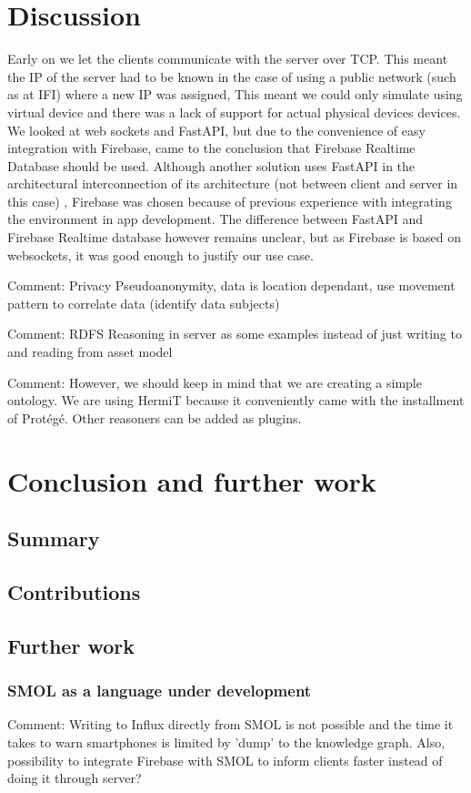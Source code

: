 \documentclass{article}
\begin{document}
\section{Discussion}\label{sec:Discussion}
Early on we let the clients communicate with the server over TCP. This meant the IP of the server had to be known in the case of using a public network (such as at IFI) where a new IP was assigned, This meant we could only simulate using virtual device and there was a lack of support for actual physical devices devices. We looked at web sockets and FastAPI, but due to the convenience of easy integration with Firebase, came to the conclusion that Firebase Realtime Database should be used. Although another solution uses FastAPI in the architectural interconnection of its architecture (not between client and server in this case) \cite{waszak_let_2022}, Firebase was chosen because of previous experience with integrating the environment in app development. The difference between FastAPI and Firebase Realtime database however remains unclear, but as Firebase is based on websockets, it was good enough to justify our use case.

Comment: Privacy
    Pseudoanonymity, data is location dependant, use movement pattern to correlate data (identify data subjects)


Comment: RDFS Reasoning in server as some examples instead of just writing to and reading from asset model

Comment: However, we should keep in mind that we are creating a simple ontology. We are using HermiT because it conveniently came with the installment of Protégé. Other reasoners can be added as plugins.




\newpage
\section{Conclusion and further work}\label{sec:Conclusion}
\subsection{Summary}
\subsection{Contributions}
\subsection{Further work}
\subsubsection{SMOL as a language under development}
Comment: Writing to Influx directly from SMOL is not possible and the time it takes to warn smartphones is limited by 'dump' to the knowledge graph. Also, possibility to integrate Firebase with SMOL to inform clients faster instead of doing it through server?
\end{document}
